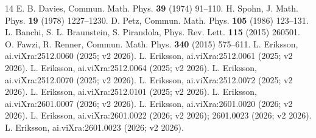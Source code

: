 \documentclass[11pt]{article}
\theoremstyle{remark}
\begin{document}
\begin{thebibliography}{14}
 E. B. Davies, Commun. Math. Phys. \textbf{39} (1974)
91--110.
 H. Spohn, J. Math. Phys. \textbf{19} (1978) 1227--1230.
 D. Petz, Commun. Math. Phys. \textbf{105} (1986) 123--131.
 L. Banchi, S. L. Braunstein, S. Pirandola, Phys. Rev. Lett.
\textbf{115} (2015) 260501.
 O. Fawzi, R. Renner, Commun. Math. Phys. \textbf{340} (2015)
575--611.
 L. Eriksson, ai.viXra:2512.0060 (2025; v2 2026).
 L. Eriksson, ai.viXra:2512.0061 (2025; v2 2026).
 L. Eriksson, ai.viXra:2512.0064 (2025; v2 2026).
 L. Eriksson, ai.viXra:2512.0070 (2025; v2 2026).
 L. Eriksson, ai.viXra:2512.0072 (2025; v2 2026).
 L. Eriksson, ai.viXra:2512.0101 (2025; v2 2026).
 L. Eriksson, ai.viXra:2601.0007 (2026; v2 2026).
 L. Eriksson, ai.viXra:2601.0020 (2026; v2 2026).
 L. Eriksson, ai.viXra:2601.0022 (2026; v2 2026);
2601.0023 (2026; v2 2026).
 L. Eriksson, ai.viXra:2601.0023 (2026; v2 2026).
\end{thebibliography}
\end{document}

